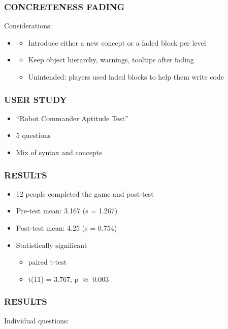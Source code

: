 \documentclass{beamer}
\let\theframetitle\frametitle
\renewcommand\frametitle[1]{\theframetitle{\MakeUppercase{#1}}}
\begin{document}
\begin{frame}
\frametitle{Concreteness Fading}
Considerations:
\begin{itemize}
\item<1-> 
  \begin{itemize}
  \item<2-> Introduce either a new concept or a faded block per level
  \end{itemize}
\item<1-> 
  \begin{itemize}
  \item<3-> Keep object hierarchy, warnings, tooltips after fading
  \item<3-> Unintended: players used faded blocks to help them write code
  \end{itemize}
\end{itemize}
\end{frame}

\begin{frame}
\frametitle{User Study}
\begin{itemize}
\item ``Robot Commander Aptitude Test''
\item 5 questions
\item Mix of syntax and concepts
\end{itemize}
\end{frame}

\begin{frame}
\frametitle{Results}
\begin{itemize}
\item<1-> 12 people completed the game and post-test
\item<1-> Pre-test mean: 3.167 (s = 1.267)
\item<1-> Post-test mean: 4.25 (s = 0.754)
\item<2-> Statistically significant
    \begin{itemize}
    \item paired t-test
    \item t(11) = 3.767, p $\approx$ 0.003
    \end{itemize}
\end{itemize}
\end{frame}

\begin{frame}
\frametitle{Results}
Individual questions:

\end{frame}
\end{document}
